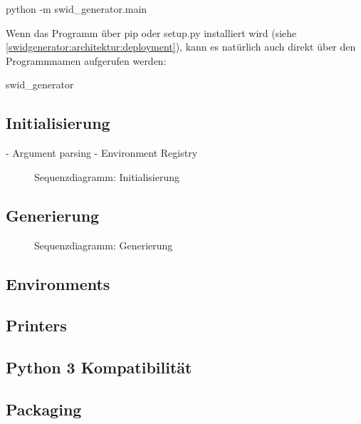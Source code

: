 \begin{bashcode}
python -m swid_generator.main
\end{bashcode}

Wenn das Programm über pip oder setup.py installiert wird (siehe
\autoref{swidgenerator:architektur:deployment}), kann es natürlich auch direkt
über den Programmnamen aufgerufen werden:

\begin{bashcode}
swid_generator
\end{bashcode}

\subsection{Initialisierung}

- Argument parsing
- Environment Registry

\begin{figure}[H]
	\centering
	
	\caption{Sequenzdiagramm: Initialisierung}
\end{figure}

\subsection{Generierung}

\begin{figure}[H]
	\centering
	
	\caption{Sequenzdiagramm: Generierung}
\end{figure}


\subsection{Environments}
\label{swidgenerator:architektur:environments}

\subsection{Printers}
\label{swidgenerator:architektur:printers}


\subsection{Python 3 Kompatibilität}


\subsection{Packaging}

